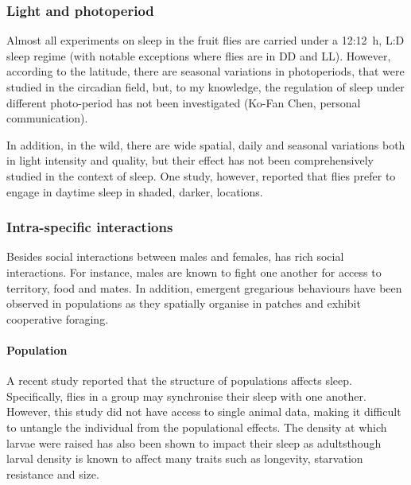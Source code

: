 \subsubsection{Light and photoperiod}
Almost all experiments on sleep in the fruit flies are carried under a 12:12~h, L:D sleep regime (with notable exceptions where flies are in DD\cite{hendricks_need_2000,joiner_sleep_2006,parisky_pdf_2008} and LL\cite{shang_light-arousal_2008}). 
However, according to the latitude, there are seasonal variations in photoperiods, that were studied in the circadian field\cite{stoleru_drosophila_2007,costa_latitudinal_1992}, but, to my knowledge, the regulation of sleep under different photo-period has not been investigated (Ko-Fan Chen, personal communication).

In addition, in the wild, there are wide spatial, daily and seasonal variations both in light intensity and quality, but their effect has not been comprehensively studied in the context of \droso{} sleep. 
One study, however, reported that flies prefer to engage in daytime sleep in shaded, darker, locations\cite{garbe_context-specific_2015}.

\subsubsection{Intra-specific interactions}
Besides social interactions between males and females, \droso{} has rich social interactions\cite{sokolowski_social_2010}.
For instance, males are known to fight one another for access to territory, food and mates\cite{kravitz_aggression_2015}.
In addition, emergent gregarious behaviours have been observed in populations as they spatially organise in patches\cite{navarro_pattern_1975,lefranc_non-independence_2001} 
and exhibit cooperative foraging\cite{tinette_cooperation_2004,simon_simple_2012}.

\paragraph*{Population}
A recent study reported that the structure of populations affects sleep.
Specifically, flies in a group may synchronise their sleep with one another\cite{liu_sleep_2015}.
However, this study did not have access to single animal data, making it difficult to untangle the individual from the populational effects\cite{ly_neurobiological_2018}. 
The density at which larvae were raised has also been shown to impact their sleep as adults\cite{chi_larval_2014}\emd{}though larval density is known to affect many traits such as longevity, starvation resistance and size\cite{baldal_effects_2005}.

